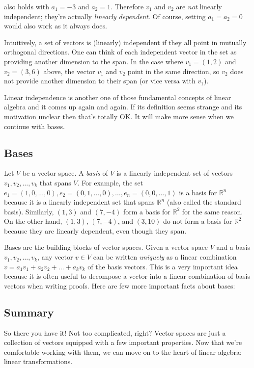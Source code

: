 \documentclass[12pt]{article}
\begin{document}
also holds with $a_1 = -3$ and $a_2 = 1$. Therefore $v_1$ and $v_2$ are \textit{not} linearly independent; they're actually \textit{linearly dependent}. Of course, setting $a_1 = a_2 = 0$ would also work as it always does.

Intuitively, a set of vectors is (linearly) independent if they all point in mutually orthogonal directions. One can think of each independent vector in the set as providing another dimension to the span. In the case where $v_1 = (1, 2)$ and $v_2 = (3, 6)$ above, the vector $v_1$ and $v_2$ point in the same direction, so $v_2$ does not provide another dimension to their span (or vice versa with $v_1$). 

Linear independence is another one of those fundamental concepts of linear algebra and it comes up again and again. If its definition seems strange and its motivation unclear then that's totally OK. It will make more sense when we continue with bases.

\subsection*{Bases}

Let $V$ be a vector space. A \textit{basis} of $V$ is a linearly independent set of vectors $v_1, v_2, \ldots, v_k$ that spans $V$. For example, the set $e_1 = (1, 0, \ldots, 0), e_2 = (0, 1, \ldots, 0), \ldots, e_n = (0, 0, \ldots, 1)$ is a basis for $\mathbb{R}^n$ because it is a linearly independent set that spans $\mathbb{R}^n$ (also called the standard basis).  Similarly, $(1, 3)$ and $(7, -4)$ form a basis for $\mathbb{R}^2$ for the same reason. On the other hand, $(1, 3)$, $(7, -4)$, and $(3, 10)$ do not form a basis for $\mathbb{R}^2$ because they are linearly dependent, even though they span.

Bases are the building blocks of vector spaces. Given a vector space $V$ and a basis $v_1, v_2, \ldots, v_k$, any vector $v \in V$ can be written \textit{uniquely} as a linear combination $v = a_1 v_1 + a_2 v_2 + \ldots + a_k v_k$ of the basis vectors. This is a very important idea because it is often useful to decompose a vector into a linear combination of basis vectors when writing proofs. Here are few more important facts about bases:



\subsection*{Summary}

So there you have it! Not too complicated, right? Vector spaces are just a collection of vectors equipped with a few important properties. Now that we're comfortable working with them, we can move on to the heart of linear algebra:  linear transformations.
\end{document}

